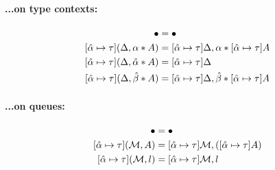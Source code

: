 \documentclass{article}
\newcommand{\mypar}[1]{\vspace{0.2cm}\paragraph{#1:} \hfill\vspace{0.1cm}}
\begin{document}
\noindent
\begin{minipage}[t]{0.47\textwidth}
  \mypar{{...on type contexts}}
  \begin{align*}
    [\unification{\alpha}{\tau}]\bullet &= \bullet\\
    [\unification{\alpha}{\tau}](\Delta,\tentry{\alpha}{A}) &= [\unification{\alpha}{\tau}]\Delta,\tentry{\alpha}{[\unification{\alpha}{\tau}]A}\\
    [\unification{\alpha}{\tau}](\Delta,\tentry{\hat\alpha}{A}) &= [\unification{\alpha}{\tau}]\Delta\\
    [\unification{\alpha}{\tau}](\Delta,\tentry{\hat\beta}{A}) &= [\unification{\alpha}{\tau}]\Delta,\tentry{\hat\beta}{[\unification{\alpha}{\tau}]A}
  \end{align*}
\end{minipage}
\begin{minipage}[t]{0.47\textwidth}
    \mypar{{...on queues}}
  \begin{align*}
    [\unification{\alpha}{\tau}]\bullet &= \bullet\\
    [\unification{\alpha}{\tau}](\mathcal{M},A) &= [\unification{\alpha}{\tau}]\mathcal{M},([\unification{\alpha}{\tau}]A)\\
    [\unification{\alpha}{\tau}](\mathcal{M},l) &= [\unification{\alpha}{\tau}]\mathcal{M},l
  \end{align*}
\end{minipage}\\
\end{document}
